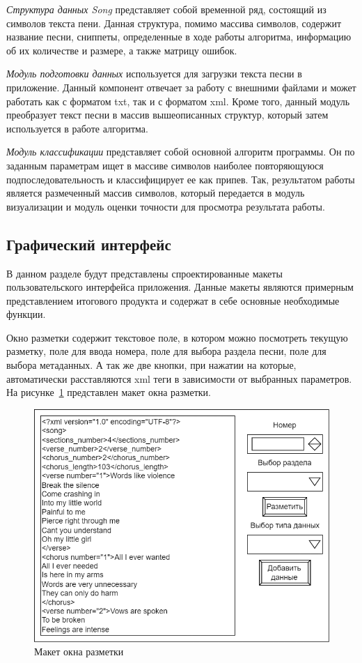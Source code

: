 \textit{Структура данных Song} представляет собой временной ряд, состоящий из символов текста пени. Данная структура, помимо массива символов, содержит название песни, сниппеты, определенные в ходе работы алгоритма, информацию об их количестве и размере, а также матрицу ошибок.

\textit{Модуль подготовки данных} используется для загрузки текста песни в приложение. Данный компонент отвечает за работу с внешними файлами и может работать как с форматом txt, так и с форматом xml. Кроме того, данный модуль преобразует текст песни в массив вышеописанных структур, который затем используется в работе алгоритма.

\textit{Модуль классификации} представляет собой основной алгоритм программы. Он по заданным параметрам ищет в массиве символов наиболее повторяющуюся подпоследовательность и классифицирует ее как припев. Так, результатом работы является размеченный массив символов, который передается в модуль визуализации и модуль оценки точности для просмотра результата работы.

\vspace{2em}
\subsection{Графический интерфейс}
В данном разделе будут представлены спроектированные макеты
пользовательского интерфейса приложения. Данные макеты являются примерным представлением итогового продукта и содержат в себе основные
необходимые функции.

Окно разметки содержит текстовое поле, в котором можно посмотреть текущую разметку, поле для ввода номера, поле для выбора раздела песни, поле для выбора метаданных. А так же две кнопки, при нажатии на которые, автоматически расставляются xml теги в зависимости от выбранных параметров. На рисунке~\ref{fig:Разметка} представлен макет окна разметки.

\begin{figure}
    \centering
    \includegraphics[width=1\linewidth]{pictures/Разметка.png}
    \caption{Макет окна разметки}
    \label{fig:Разметка}
\end{figure}

